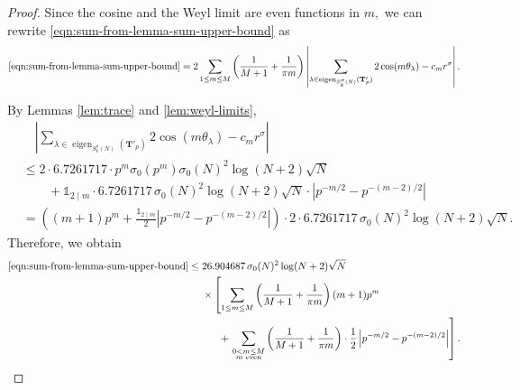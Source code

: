 \documentclass[10pt,a4paper]{amsart}
\newcommand{\eigen}{\operatorname{eigen}}
\begin{document}
\begin{proof}
    Since the cosine and the Weyl limit are even functions in $m,$ we can rewrite \eqref{eqn:sum-from-lemma-sum-upper-bound} as
\[
\eqref{eqn:sum-from-lemma-sum-upper-bound} =
2\sum_{1\leq m\leq M}
\left(
\frac{1}{M+1}
+
\frac{1}{\pi m}
\right)
\left|
\sum_{\lambda \in \eigen_{S_k^\sigma(N)}(\mathbf{T}'_p)} 2\cos(m\theta_{\lambda})-c_m r^\sigma
\right|.
\]

By Lemmas \ref{lem:trace} and \ref{lem:weyl-limits},
\begin{align*}
    & \quad \left|
\sum_{\lambda \in \eigen_{S_k^\sigma(N)}(\mathbf{T}'_p)} 2\cos(m \theta_\lambda )-c_m r^\sigma
\right| \\
&\leq 2\cdot 6.7261717 \cdot  p^m \sigma_0(p^m) \sigma_0(N)^2 \log(N + 2) \sqrt{N} \\
&\qquad + \mathds{1}_{2 \mid m} \cdot 6.7261717 \,  \sigma_0(N)^2 \log(N + 2) \sqrt{N} \cdot \left| p^{-m/2} - p^{-(m - 2)/2}  \right|  \\
&= \left( (m + 1)p^m  +  \frac{\mathds{1}_{2 \mid m}}{2}\left| p^{-m/2} - p^{-(m - 2)/2}  \right|\right) \cdot 2 \cdot 6.7261717  \,  \sigma_0(N)^2 \log(N + 2) \sqrt{N}.
\end{align*}
Therefore, we obtain
\begin{align}
    \eqref{eqn:sum-from-lemma-sum-upper-bound} &\leq 26.904687 \,\sigma_0(N)^2 \log(N + 2) \sqrt{N}\\
    & \quad\ \times \left[ \sum_{1 \leq m \leq M} \left( \frac{1}{M + 1} + \frac{1}{\pi m} \right) (m + 1)p^m \right. \label{eqn:sum-upper-bound-expression-1}\\
    & \qquad\quad + \left. \sum_{\substack{0 < m \leq M\\ \text{$m$ even}}} \left( \frac{1}{M + 1} + \frac{1}{\pi m} \right) \cdot \frac{1}{2}\left| p^{-m/2} - p^{-(m - 2)/2} \right| \right] . \label{eqn:sum-upper-bound-expression-2}
\end{align}


\end{proof}
\end{document}
